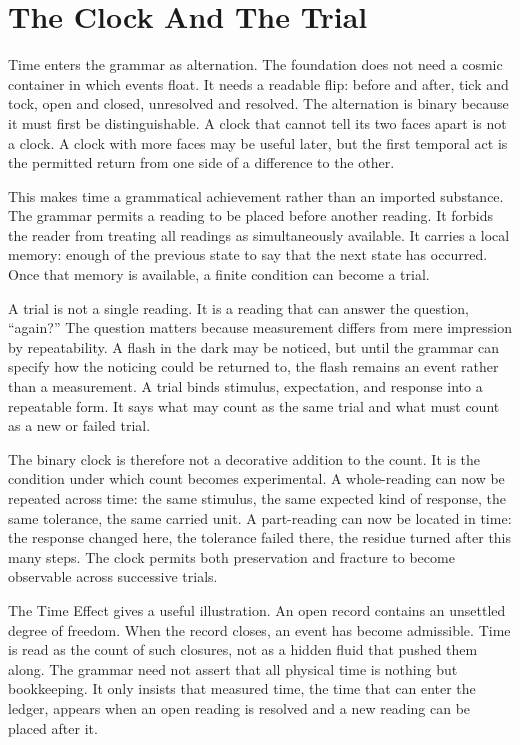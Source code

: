 \section{The Clock And The Trial}

Time enters the grammar as alternation. The foundation does not need a
cosmic container in which events float. It needs a readable flip: before
and after, tick and tock, open and closed, unresolved and resolved. The
alternation is binary because it must first be distinguishable. A clock
that cannot tell its two faces apart is not a clock. A clock with more
faces may be useful later, but the first temporal act is the permitted
return from one side of a difference to the other.

This makes time a grammatical achievement rather than an imported
substance. The grammar permits a reading to be placed before another
reading. It forbids the reader from treating all readings as
simultaneously available. It carries a local memory: enough of the
previous state to say that the next state has occurred. Once that memory
is available, a finite condition can become a trial.

A trial is not a single reading. It is a reading that can answer the
question, ``again?'' The question matters because measurement differs
from mere impression by repeatability. A flash in the dark may be
noticed, but until the grammar can specify how the noticing could be
returned to, the flash remains an event rather than a measurement. A
trial binds stimulus, expectation, and response into a repeatable form.
It says what may count as the same trial and what must count as a new or
failed trial.

The binary clock is therefore not a decorative addition to the count. It
is the condition under which count becomes experimental. A whole-reading
can now be repeated across time: the same stimulus, the same expected
kind of response, the same tolerance, the same carried unit. A
part-reading can now be located in time: the response changed here, the
tolerance failed there, the residue turned after this many steps. The
clock permits both preservation and fracture to become observable across
successive trials.

The Time Effect gives a useful illustration. An open record contains an
unsettled degree of freedom. When the record closes, an event has become
admissible. Time is read as the count of such closures, not as a hidden
fluid that pushed them along. The grammar need not assert that all
physical time is nothing but bookkeeping. It only insists that measured
time, the time that can enter the ledger, appears when an open reading is
resolved and a new reading can be placed after it.

